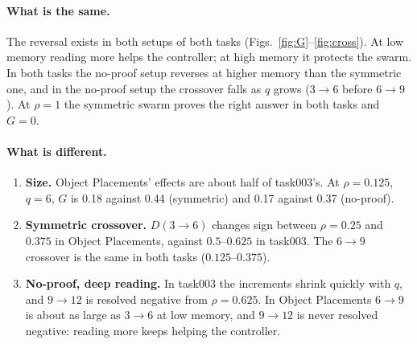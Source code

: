 \documentclass[10pt,a4paper]{article}
\begin{document}
\paragraph{What is the same.} The reversal exists in both setups of both tasks (Figs.~\ref{fig:G}--\ref{fig:cross}). At
low memory reading more helps the controller; at high memory it protects the swarm. In both tasks the no-proof setup
reverses at higher memory than the symmetric one, and in the no-proof setup the crossover falls as $q$ grows ($3\to6$
before $6\to9$). At $\rho=1$ the symmetric swarm proves the right answer in both tasks and $G=0$.

\paragraph{What is different.}
\begin{enumerate}
\item \textbf{Size.} Object Placements' effects are about half of task003's. At $\rho=0.125$, $q=6$, $G$ is 0.18 against
  0.44 (symmetric) and 0.17 against 0.37 (no-proof).
\item \textbf{Symmetric crossover.} $D(3\to6)$ changes sign between $\rho=0.25$ and $0.375$ in Object Placements,
  against $0.5$--$0.625$ in task003. The $6\to9$ crossover is the same in both tasks ($0.125$--$0.375$).
\item \textbf{No-proof, deep reading.} In task003 the increments shrink quickly with $q$, and $9\to12$ is resolved negative
  from $\rho=0.625$. In Object Placements $6\to9$ is about as large as $3\to6$ at low memory, and $9\to12$ is never
  resolved negative: reading more keeps helping the controller.
\end{enumerate}
\end{document}
